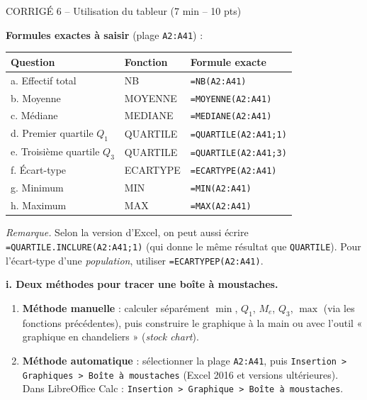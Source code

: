 \documentclass[11pt,a4paper]{article}
\begin{document}
\begin{epreuve}{CORRIGÉ 6 -- Utilisation du tableur \hfill \small (7 min -- 10 pts)}

\vspace{0.2cm}
\textbf{Formules exactes à saisir} (plage \texttt{A2:A41}) :

\vspace{0.2cm}
\begin{center}
\renewcommand{\arraystretch}{1.5}
\begin{tabular}{|l|l|l|}
\hline
\rowcolor{corrige!15}
\textbf{Question} & \textbf{Fonction} & \textbf{Formule exacte} \\
\hline
a. Effectif total & NB & \texttt{=NB(A2:A41)} \\
\hline
b. Moyenne & MOYENNE & \texttt{=MOYENNE(A2:A41)} \\
\hline
c. Médiane & MEDIANE & \texttt{=MEDIANE(A2:A41)} \\
\hline
d. Premier quartile $Q_1$ & QUARTILE & \texttt{=QUARTILE(A2:A41;1)} \\
\hline
e. Troisième quartile $Q_3$ & QUARTILE & \texttt{=QUARTILE(A2:A41;3)} \\
\hline
f. Écart-type & ECARTYPE & \texttt{=ECARTYPE(A2:A41)} \\
\hline
g. Minimum & MIN & \texttt{=MIN(A2:A41)} \\
\hline
h. Maximum & MAX & \texttt{=MAX(A2:A41)} \\
\hline
\end{tabular}
\end{center}

\medskip
\emph{Remarque.} Selon la version d'Excel, on peut aussi écrire \texttt{=QUARTILE.INCLURE(A2:A41;1)} (qui donne le même résultat que \texttt{QUARTILE}). Pour l'écart-type d'une \emph{population}, utiliser \texttt{=ECARTYPEP(A2:A41)}.

\vspace{0.3cm}
\textbf{i. Deux méthodes pour tracer une boîte à moustaches.}

\begin{enumerate}[leftmargin=*,itemsep=2pt]
  \item \textbf{Méthode manuelle} : calculer séparément $\min$, $Q_1$, $M_e$, $Q_3$, $\max$ (via les fonctions précédentes), puis construire le graphique à la main ou avec l'outil « graphique en chandeliers » (\emph{stock chart}).
  \item \textbf{Méthode automatique} : sélectionner la plage \texttt{A2:A41}, puis \texttt{Insertion > Graphiques > Boîte à moustaches} (Excel 2016 et versions ultérieures). Dans LibreOffice Calc : \texttt{Insertion > Graphique > Boîte à moustaches}.
\end{enumerate}


\end{epreuve}
\end{document}
